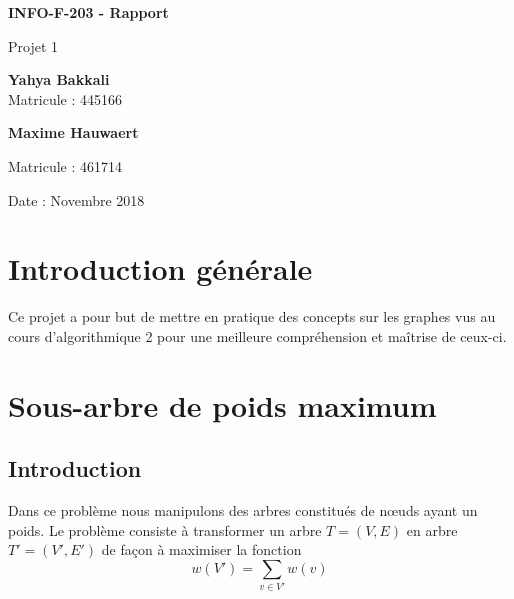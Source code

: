 \documentclass{article}
\begin{document}
\begin{titlepage}
    \begin{center}
        \vspace*{1cm}
        
        \Huge
        \textbf{INFO-F-203 - Rapport}
        
        \vspace{0.5cm}
        \LARGE
        Projet 1
        
        \vspace{1.5cm}
        
        \textbf{Yahya Bakkali\\}
        \Large
        Matricule : 445166\\
        
		\vspace{0.5cm}        
        
        \LARGE
        \textbf{Maxime Hauwaert\\}
        
		\Large        
        Matricule : 461714\\
        
        \vspace{0.8cm}

        Date : Novembre 2018
        
    \end{center}
\end{titlepage}

\setcounter{tocdepth}{3}
\tableofcontents
\newpage
\large
	
\section{Introduction générale}
Ce projet a pour but de mettre en pratique des concepts sur les graphes vus au cours d’algorithmique 2 pour une meilleure compréhension et maîtrise de ceux-ci.

\section{Sous-arbre de poids maximum}
	\subsection{Introduction}
		Dans ce problème nous manipulons des arbres constitués de nœuds ayant un poids. Le problème consiste à transformer un arbre $T=(V,E)$ en arbre ${T'}=({V'},{E'})$ de façon à maximiser la fonction
		$$w({V'})=\sum_{v\in{V'}} w(v)$$
\end{document}
